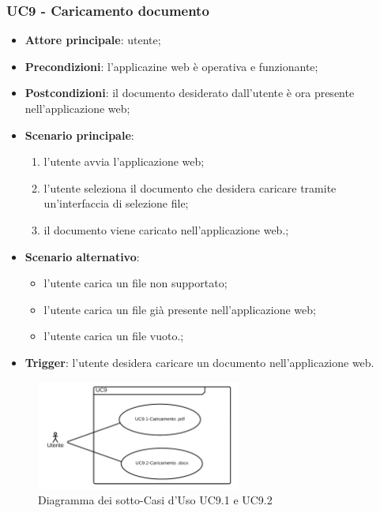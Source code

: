 \documentclass[10pt, a4paper]{article}
\begin{document}
    \subsubsection{UC9 - Caricamento documento} 
    \begin{itemize}
        \item \textbf{Attore principale}: utente;
        \item \textbf{Precondizioni}: l'applicazine web è operativa e funzionante;
        \item \textbf{Postcondizioni}: il documento desiderato dall'utente è ora presente nell'applicazione web;
        \item \textbf{Scenario principale}:
            \begin{enumerate}
                \item l'utente avvia l'applicazione web;
                \item l'utente seleziona il documento che desidera caricare tramite un'interfaccia di selezione file;
                \item il documento viene caricato nell'applicazione web.;
            \end{enumerate}
        \item \textbf{Scenario alternativo}:
            \begin{itemize}
                \item l'utente carica un file non supportato;
                \item l'utente carica un file già presente nell'applicazione web;
                \item l'utente carica un file vuoto.;
            \end{itemize}
        \item \textbf{Trigger}: l'utente desidera caricare un documento nell'applicazione web.
    \end{itemize}

    \begin{figure}[h]
        \centering
        \includegraphics[width=0.6\textwidth, height=0.6\textheight, keepaspectratio]{UC-images/UC9.1-UC9.2.png}
        \caption{Diagramma dei sotto-Casi d'Uso UC9.1 e UC9.2}
    \end{figure}
    
\end{document}
